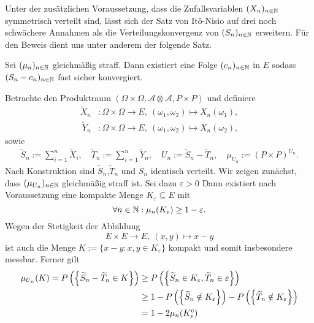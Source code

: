 Unter der zusätzlichen Voraussetzung, dass die Zufallsvariablen $(X_n)_{n \in \mathbb{N}}$  symmetrisch verteilt sind, lässt sich der Satz von Itô-Nisio auf drei noch schwächere Annahmen als die Verteilungskonvergenz von $(S_n)_{n \in \mathbb{N}}$ erweitern. 
Für den Beweis dient uns unter anderem der folgende Satz. 
\begin{theorem}
    Sei $(\mu_n)_{n \in \mathbb{N}}$ gleichmäßig straff. Dann existiert eine Folge $(c_n)_{n \in \mathbb{N}}$ in $E$ sodass $(S_n - c_n)_{n \in \mathbb{N}}$ fast sicher konvergiert.
\end{theorem}

\begin{proof*}
    Betrachte den Produktraum $(\Omega \times \Omega, \mathcal{A} \otimes \mathcal{A}, P \times P)$ und definiere 
    \begin{align*}
        \widetilde{X}_n&: \Omega \times \Omega \to E, \ (\omega_1, \omega_2) \mapsto X_n(\omega_1), \\\
        \widetilde{Y}_n&: \Omega \times \Omega \to E, \ (\omega_1, \omega_2) \mapsto X_n(\omega_2),
    \end{align*}
    sowie 
    \begin{align*}
        \widetilde{S}_n := \sum_{i = 1}^n \widetilde{X}_i, \quad \widetilde{T}_n := \sum_{i = 1}^n \widetilde{Y}_n, \quad U_n := \widetilde{S}_n - \widetilde{T}_n, \quad \mu_{U_n} := (P\times P)^{U_n}. 
    \end{align*}
    Nach Konstruktion sind $\widetilde{S}_n$,$\widetilde{T}_n$ und $S_n$ identisch verteilt. Wir zeigen zunächst, dass $(\mu_{U_n})_{n \in \mathbb{N}}$ gleichmäßig straff ist. 
    Sei dazu $\varepsilon > 0$ Dann existiert nach Voraussetzung eine kompakte Menge $K_{\varepsilon} \subseteq E$ mit 
    $$
        \forall n \in \mathbb{N}: \mu_n(K_{\varepsilon}) \geq 1 - \varepsilon. 
    $$
    Wegen der Stetigkeit der Abbildung 
    $$
        E \times E \to E, \ (x,y) \mapsto x - y
    $$
    ist auch die Menge $K := \{ x - y : x,y \in K_{\varepsilon} \}$ kompakt und somit insbesondere messbar. Ferner gilt
    \begin{align*}
        \mu_{U_n}(K) = \prob{\widetilde{S}_n - \widetilde{T}_n \in K} &\geq \prob{\widetilde{S}_n \in K_{\varepsilon}, \widetilde{T}_n \in \varepsilon} \\\
                                                              &\geq 1 - \prob{\widetilde{S}_n \notin K_{\varepsilon}} - \prob{\widetilde{T}_n \notin K_{\varepsilon}} \\\
                                                              &= 1 - 2\mu_n(K_{\varepsilon}^c) \\\

\end{align*}
\end{proof*}

